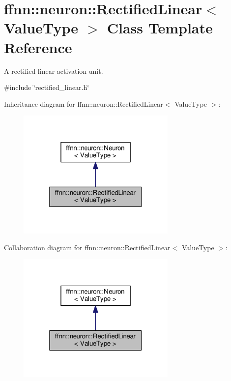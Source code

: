 \hypertarget{classffnn_1_1neuron_1_1_rectified_linear}{\section{ffnn\-:\-:neuron\-:\-:Rectified\-Linear$<$ Value\-Type $>$ Class Template Reference}
\label{classffnn_1_1neuron_1_1_rectified_linear}
}


A rectified linear activation unit.  




{\ttfamily \#include \char`\"{}rectified\-\_\-linear.\-h\char`\"{}}



Inheritance diagram for ffnn\-:\-:neuron\-:\-:Rectified\-Linear$<$ Value\-Type $>$\-:\nopagebreak
\begin{figure}[H]
\begin{center}
\leavevmode
\includegraphics[width=220pt]{classffnn_1_1neuron_1_1_rectified_linear__inherit__graph}
\end{center}
\end{figure}


Collaboration diagram for ffnn\-:\-:neuron\-:\-:Rectified\-Linear$<$ Value\-Type $>$\-:\nopagebreak
\begin{figure}[H]
\begin{center}
\leavevmode
\includegraphics[width=220pt]{classffnn_1_1neuron_1_1_rectified_linear__coll__graph}
\end{center}
\end{figure}
